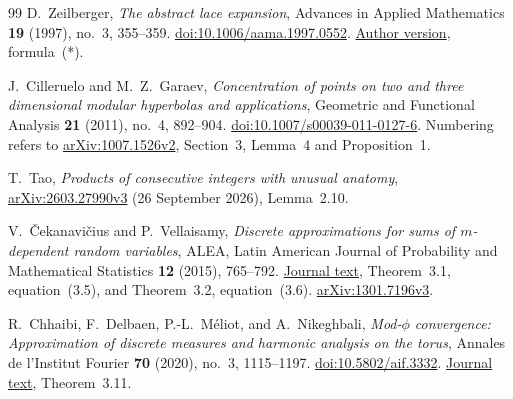 \begin{thebibliography}{99}
D.~Zeilberger,
\emph{The abstract lace expansion},
Advances in Applied Mathematics \textbf{19} (1997),
no.~3, 355--359.
\href{https://doi.org/10.1006/aama.1997.0552}
{doi:10.1006/aama.1997.0552}.
\href{https://sites.math.rutgers.edu/~zeilberg/mamarim/mamarimPDF/lace.pdf}
{Author version}, formula~(*).

J.~Cilleruelo and M.~Z.~Garaev,
\emph{Concentration of points on two and three dimensional
modular hyperbolas and applications},
Geometric and Functional Analysis \textbf{21} (2011),
no.~4, 892--904.
\href{https://doi.org/10.1007/s00039-011-0127-6}
{doi:10.1007/s00039-011-0127-6}.
Numbering refers to
\href{https://arxiv.org/abs/1007.1526v2}{arXiv:1007.1526v2},
Section~3, Lemma~4 and Proposition~1.

T.~Tao,
\emph{Products of consecutive integers with unusual anatomy},
\href{https://arxiv.org/abs/2603.27990v3}{arXiv:2603.27990v3}
(26 September 2026), Lemma~2.10.

V.~\v{C}ekanavi\v{c}ius and P.~Vellaisamy,
\emph{Discrete approximations for sums of $m$-dependent random variables},
ALEA, Latin American Journal of Probability and Mathematical Statistics
\textbf{12} (2015), 765--792.
\href{https://alea.impa.br/articles/v12/12-29.pdf}{Journal text},
Theorem~3.1, equation~(3.5), and Theorem~3.2, equation~(3.6).
\href{https://arxiv.org/abs/1301.7196v3}{arXiv:1301.7196v3}.

R.~Chhaibi, F.~Delbaen, P.-L.~M\'eliot, and A.~Nikeghbali,
\emph{Mod-$\phi$ convergence: Approximation of discrete measures
and harmonic analysis on the torus},
Annales de l'Institut Fourier \textbf{70} (2020),
no.~3, 1115--1197.
\href{https://doi.org/10.5802/aif.3332}{doi:10.5802/aif.3332}.
\href{https://numdam.org/item/10.5802/aif.3332.pdf}{Journal text},
Theorem~3.11.

\end{thebibliography}
